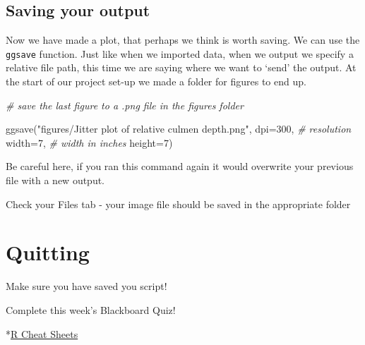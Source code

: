 \documentclass[
]{book}
\makeatletter
\newenvironment{Shaded}{\begin{snugshade}}{\end{snugshade}}
\newcommand{\AttributeTok}[1]{\textcolor[rgb]{0.77,0.63,0.00}{#1}}
\newcommand{\CommentTok}[1]{\textcolor[rgb]{0.56,0.35,0.01}{\textit{#1}}}
\newcommand{\DecValTok}[1]{\textcolor[rgb]{0.00,0.00,0.81}{#1}}
\newcommand{\FunctionTok}[1]{\textcolor[rgb]{0.00,0.00,0.00}{#1}}
\newcommand{\NormalTok}[1]{#1}
\newcommand{\StringTok}[1]{\textcolor[rgb]{0.31,0.60,0.02}{#1}}
\newenvironment{kframe}{%
\medskip{}
\setlength{\fboxsep}{.8em}
 \def\at@end@of@kframe{}%
 \ifinner\ifhmode%
  \def\at@end@of@kframe{\end{minipage}}%
  \begin{minipage}{\columnwidth}%
 \fi\fi%
 \def\FrameCommand##1{\hskip\@totalleftmargin \hskip-\fboxsep
 \colorbox{shadecolor}{##1}\hskip-\fboxsep
     \hskip-\linewidth \hskip-\@totalleftmargin \hskip\columnwidth}%
 \MakeFramed {\advance\hsize-\width
   \@totalleftmargin\z@ \linewidth\hsize
   \@setminipage}}%
 {\par\unskip\endMakeFramed%
 \at@end@of@kframe}
\newenvironment{block}[1]
  {
  \begin{itemize}
  \renewcommand{\labelitemi}{
    \raisebox{-.7\height}[0pt][0pt]{
      {\setkeys{Gin}{width=3em,keepaspectratio}\texttt{[image: images/\#1]}}
    }
  }
  \setlength{\fboxsep}{1em}
  \begin{kframe}
  \item
  }
  {
  \end{kframe}
  \end{itemize}
  }
\newenvironment{rmdquestion}
  {\begin{block}{question}}
  {\end{block}}
\newenvironment{rmdwarning}
  {\begin{block}{warning}}
  {\end{block}}
\makeatother
\begin{document}
\hypertarget{saving-your-output}{%
\subsection{Saving your output}\label{saving-your-output}}

Now we have made a plot, that perhaps we think is worth saving. We can use the \texttt{ggsave} function.
Just like when we imported data, when we output we specify a relative file path, this time we are saying where we want to `send' the output. At the start of our project set-up we made a folder for figures to end up.

\begin{Shaded}
\begin{Highlighting}[]
\CommentTok{\# save the last figure to a .png file in the figures folder}

\FunctionTok{ggsave}\NormalTok{(}\StringTok{"figures/Jitter plot of relative culmen depth.png"}\NormalTok{, }
       \AttributeTok{dpi=}\DecValTok{300}\NormalTok{, }\CommentTok{\# resolution}
       \AttributeTok{width=}\DecValTok{7}\NormalTok{, }\CommentTok{\# width in inches}
       \AttributeTok{height=}\DecValTok{7}\NormalTok{)}
\end{Highlighting}
\end{Shaded}

\begin{rmdwarning}
Be careful here, if you ran this command again it would overwrite your
previous file with a new output.
\end{rmdwarning}

Check your Files tab - your image file should be saved in the appropriate folder

\hypertarget{quitting-2}{%
\section{Quitting}\label{quitting-2}}

\begin{rmdwarning}
Make sure you have saved you script!
\end{rmdwarning}

\begin{rmdquestion}
Complete this week's Blackboard Quiz!
\end{rmdquestion}

*\href{https://www.rstudio.com/resources/cheatsheets/}{R Cheat Sheets}

  
\end{document}
